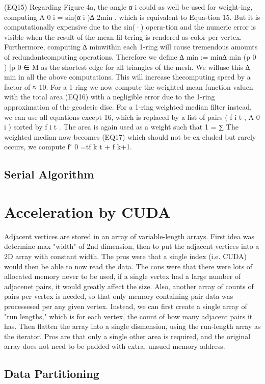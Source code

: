 \documentclass{article}
\begin{document}
(EQ15)
Regarding Figure 4a, the angle α i could as well be used for weight-ing, computing A 0 i = sin(α i )∆ 2min , which is equivalent to Equa-tion 15. But it is computationally expensive due to the sin(·) opera-tion and the numeric error is visible when the result of the mean fil-tering is rendered as color per vertex. Furthermore, computing ∆ minwithin each 1-ring will cause tremendous amounts of redundantcomputing operations. Therefore we define ∆ min := min{∆ min (p 0 ) |p 0 ∈ M} as the shortest edge for all triangles of the mesh. We willuse this ∆ min in all the above computations. This will increase thecomputing speed by a factor of ≈ 10. For a 1-ring we now compute the weighted mean function valuen with the total area 
(EQ16)
with a negligible error due to the 1-ring approximation of the geodesic disc. For a 1-ring weighted median filter instead, we can use all equations except 16, which is replaced by a list of pairs ( f i t , A 0 i ) sorted by f i t . The area is again used as a weight such that 1 = ∑ The weighted median now becomes
(EQ17)
which should not be ex-cluded but rarely occurs, we compute f  ̃ 0 =tf k t + f k+1.
\subsection{Serial Algorithm}
\section{Acceleration by CUDA}
Adjacent vertices are stored in an array of variable-length arrays.
First idea was determine max "width" of 2nd dimension, then to put the adjacent vertices into a 2D array with constant width.
The pros were that a single index (i.e. CUDA) would then be able to now read the data. 
The cons were that there were lots of allocated memory never to be used, if a single vertex had a large number of adjacenet pairs, it would greatly affect the size. Also, another array of counts of pairs per vertex is needed, so that only memory containing pair data was processesed per any given vertex.
Instead, we can first create a single array of "run lengths," which is for each vertex, the count of how many adjacent pairs it has. Then flatten the array into a single dismension, using the run-length array as the iterator.
Pros are that only a single other area is required, and the original array does not need to be padded with extra, unsued memory address.
\subsection{Data Partitioning}~\cite[p.~357]{Lang17}
\end{document}

